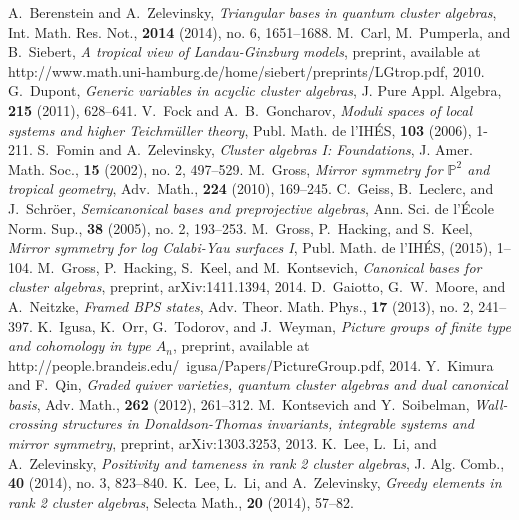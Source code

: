 \documentclass[11pt]{amsart}
\theoremstyle{remark}
\numberwithin{equation}{section}
\begin{document}
\begin{thebibliography}{99}
  
   A.~Berenstein and A.~Zelevinsky, \emph{Triangular bases in quantum cluster algebras}, Int. Math. Res. Not., \textbf{2014} (2014), no. 6, 1651--1688.
   M.~Carl, M.~Pumperla, and B.~Siebert, \emph{A tropical view of Landau-Ginzburg models}, preprint, available at http://www.math.uni-hamburg.de/home/siebert/preprints/LGtrop.pdf, 2010.
   G.~Dupont, \emph{Generic variables in acyclic cluster algebras}, J. Pure Appl. Algebra, \textbf{215} (2011), 628--641.
   V.~Fock and A.~B.~Goncharov, \emph{Moduli spaces of local systems and higher Teichm\"{u}ller theory}, Publ. Math. de l'IH\'{E}S, {\bf 103} (2006), 1-211.
   S.~Fomin and A.~Zelevinsky, \emph{Cluster algebras I: Foundations},  J. Amer. Math. Soc., \textbf{15} (2002), no. 2, 497--529.
   M.~Gross,  \emph{Mirror symmetry for $\mathbb{P}^2$ and tropical geometry}, Adv.\ Math., {\bf 224} (2010), 169--245. 
   C.~Geiss, B.~Leclerc, and J.~Schr\"{o}er, \emph{Semicanonical bases and preprojective algebras}, Ann. Sci. de l'\'{E}cole Norm. Sup., {\bf 38} (2005), no. 2, 193--253.
   M.~Gross, P.~Hacking, and S.~Keel, \emph{Mirror symmetry for log Calabi-Yau surfaces I}, Publ. Math. de l'IH\'{E}S, (2015), 1--104.
   M.~Gross, P.~Hacking, S.~Keel, and M.~Kontsevich, \emph{Canonical bases for cluster algebras}, preprint, arXiv:1411.1394, 2014.
   D.~Gaiotto, G.~W.~Moore, and A.~Neitzke, \emph{Framed BPS states}, Adv. Theor. Math. Phys., {\bf 17} (2013), no. 2, 241--397.
   K.~Igusa, K.~Orr, G.~Todorov, and J.~Weyman, \emph{Picture groups of finite type and cohomology in type $A_n$}, preprint, available at http://people.brandeis.edu/~igusa/Papers/PictureGroup.pdf, 2014.
   Y.~Kimura and F.~Qin, \emph{Graded quiver varieties, quantum cluster algebras and dual canonical basis}, Adv. Math., {\bf 262} (2012), 261--312.
   M.~Kontsevich and Y.~Soibelman, \emph{Wall-crossing structures in Donaldson-Thomas invariants, integrable systems and mirror symmetry}, preprint, arXiv:1303.3253, 2013.
   K.~Lee, L.~Li, and A.~Zelevinsky, \emph{Positivity and tameness in rank 2 cluster algebras}, J. Alg. Comb., {\bf 40} (2014), no. 3, 823--840.
   K.~Lee, L.~Li, and A.~Zelevinsky, \emph{Greedy elements in rank 2 cluster algebras}, Selecta Math., \textbf{20} (2014), 57--82.

\end{thebibliography}
\end{document}
